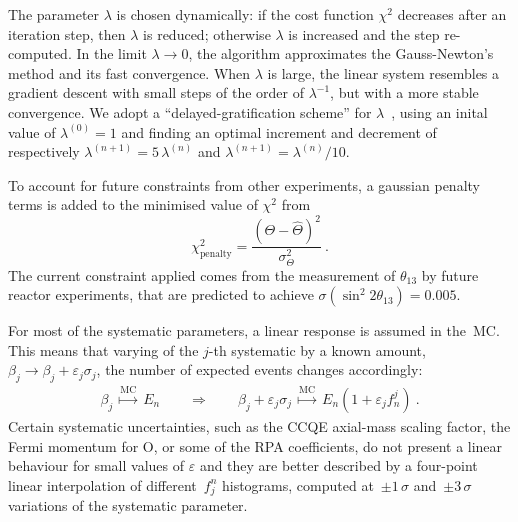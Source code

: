 The parameter $\lambda$ is chosen dynamically: if the cost function $\chi^2$ decreases %
after an iteration step, then $\lambda$ is reduced; otherwise $\lambda$ is increased and the step re-computed.
In the limit $\lambda \to 0$, the algorithm approximates the Gauss-Newton's method and its fast convergence.
When $\lambda$ is large, the linear system resembles a gradient descent with small steps of the order of $\lambda^{-1}$, %
but with a more stable convergence.
We adopt a ``delayed-gratification scheme'' for $\lambda$~\cite{Transtrum2012}, using an inital value of $\lambda^{(0)} = 1$ and finding %
an optimal increment and decrement of respectively $\lambda^{(n+1)} = 5\,\lambda^{(n)}$ and $\lambda^{(n+1)} = \lambda^{(n)} / 10$.

To account for future constraints from other experiments, a gaussian penalty terms is added %
to the minimised value of $\chi^2$ from 
\begin{equation}
	\chi^2_\text{penalty} = \frac{(\Theta - \hat{\Theta})^2}{\sigma_\Theta^2}\ .
\end{equation}
The current constraint applied comes from the measurement of $\theta_{13}$ by future reactor experiments, %
that are predicted to achieve $\sigma(\sin^2 2\theta_{13}) = 0.005$.

For most of the systematic parameters, a linear response is assumed in the~MC.
This means that varying of the $j$-th systematic by a known amount, $\beta_j \to \beta_j + \varepsilon_j\sigma_j$, %
the number of expected events changes accordingly:
\begin{align*}
	\beta_j\ \overset{\scriptstyle \text{MC}}{\longmapsto}\ E_n %
	\qquad \Longrightarrow \qquad %
	\beta_j + \varepsilon_j\sigma_j\ \overset{\text{MC}}{\longmapsto}\ E_n ( 1 + \varepsilon_j f_n ^j )\ .
\end{align*}
Certain systematic uncertainties, such as the CCQE axial-mass scaling factor, the Fermi momentum for O, %
or some of the RPA coefficients, %
do not present a linear behaviour for small values of $\varepsilon$ %
and they are better described by a four-point linear interpolation of different~$f_j^n$ histograms, %
computed at~$\pm1\,\sigma$ and~$\pm3\,\sigma$ variations of the systematic parameter.




